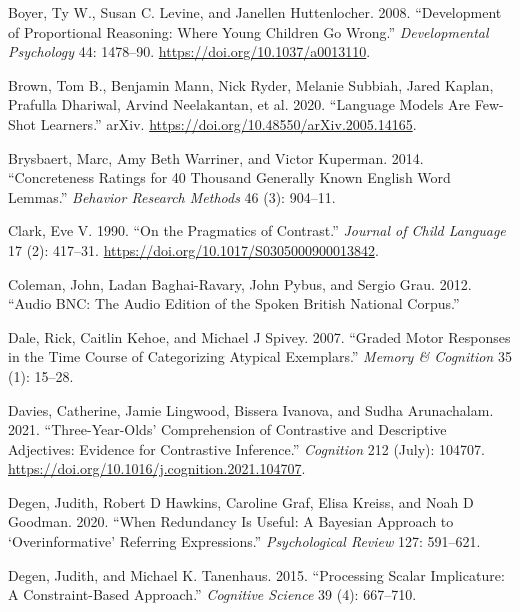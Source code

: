 \documentclass{ucetd}
\newlength{\cslhangindent}
\newenvironment{cslreferences}%
{\setlength{\parindent}{0pt}%
\everypar{\setlength{\hangindent}{\cslhangindent}}\ignorespaces}%
{\par}
\begin{document}
\begin{cslreferences}
\leavevmode\hypertarget{ref-boyer_development_2008}{}%
Boyer, Ty W., Susan C. Levine, and Janellen Huttenlocher. 2008.
``Development of Proportional Reasoning: Where Young Children Go
Wrong.'' \emph{Developmental Psychology} 44: 1478--90.
\url{https://doi.org/10.1037/a0013110}.

\leavevmode\hypertarget{ref-brown_language_2020}{}%
Brown, Tom B., Benjamin Mann, Nick Ryder, Melanie Subbiah, Jared Kaplan,
Prafulla Dhariwal, Arvind Neelakantan, et al. 2020. ``Language Models
Are Few-Shot Learners.'' arXiv.
\url{https://doi.org/10.48550/arXiv.2005.14165}.

\leavevmode\hypertarget{ref-brysbaert2014}{}%
Brysbaert, Marc, Amy Beth Warriner, and Victor Kuperman. 2014.
``Concreteness Ratings for 40 Thousand Generally Known English Word
Lemmas.'' \emph{Behavior Research Methods} 46 (3): 904--11.

\leavevmode\hypertarget{ref-clark_pragmatics_1990}{}%
Clark, Eve V. 1990. ``On the Pragmatics of Contrast.'' \emph{Journal of
Child Language} 17 (2): 417--31.
\url{https://doi.org/10.1017/S0305000900013842}.

\leavevmode\hypertarget{ref-coleman_audio_2012}{}%
Coleman, John, Ladan Baghai-Ravary, John Pybus, and Sergio Grau. 2012.
``Audio BNC: The Audio Edition of the Spoken British National Corpus.''

\leavevmode\hypertarget{ref-dale_graded_2007}{}%
Dale, Rick, Caitlin Kehoe, and Michael J Spivey. 2007. ``Graded Motor
Responses in the Time Course of Categorizing Atypical Exemplars.''
\emph{Memory \& Cognition} 35 (1): 15--28.

\leavevmode\hypertarget{ref-davies_three-year-olds_2021}{}%
Davies, Catherine, Jamie Lingwood, Bissera Ivanova, and Sudha
Arunachalam. 2021. ``Three-Year-Olds' Comprehension of Contrastive and
Descriptive Adjectives: Evidence for Contrastive Inference.''
\emph{Cognition} 212 (July): 104707.
\url{https://doi.org/10.1016/j.cognition.2021.104707}.

\leavevmode\hypertarget{ref-degen_when_2020}{}%
Degen, Judith, Robert D Hawkins, Caroline Graf, Elisa Kreiss, and Noah D
Goodman. 2020. ``When Redundancy Is Useful: A Bayesian Approach to
`Overinformative' Referring Expressions.'' \emph{Psychological Review}
127: 591--621.

\leavevmode\hypertarget{ref-degen_processing_2015}{}%
Degen, Judith, and Michael K. Tanenhaus. 2015. ``Processing Scalar
Implicature: A Constraint-Based Approach.'' \emph{Cognitive Science} 39
(4): 667--710.


\end{cslreferences}
\end{document}
